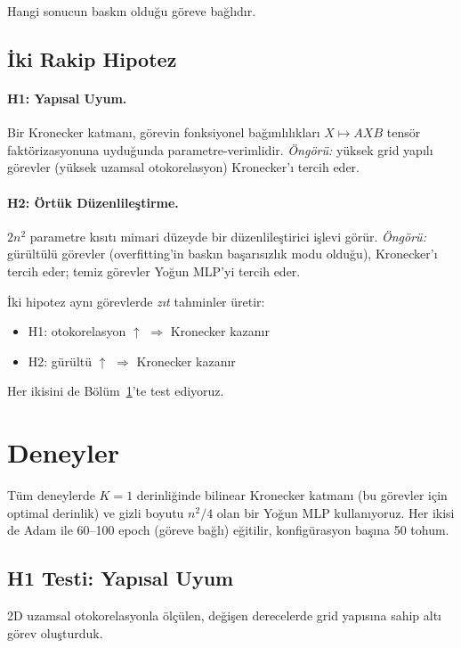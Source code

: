 \documentclass[11pt,a4paper]{article}
\begin{document}
Hangi sonucun baskın olduğu göreve bağlıdır.

\subsection{İki Rakip Hipotez}
\label{sec:hypotheses}

\paragraph{H1: Yapısal Uyum.}
Bir Kronecker katmanı, görevin fonksiyonel bağımlılıkları
$X \mapsto AXB$ tensör faktörizasyonuna uyduğunda
parametre-verimlidir. \emph{Öngörü:} yüksek grid yapılı görevler
(yüksek uzamsal otokorelasyon) Kronecker'ı tercih eder.

\paragraph{H2: Örtük Düzenlileştirme.}
$2n^2$ parametre kısıtı mimari düzeyde bir düzenlileştirici
işlevi görür. \emph{Öngörü:} gürültülü görevler (overfitting'in
baskın başarısızlık modu olduğu), Kronecker'ı tercih eder;
temiz görevler Yoğun MLP'yi tercih eder.

İki hipotez aynı görevlerde \emph{zıt} tahminler üretir:
\begin{itemize}
\item H1: otokorelasyon $\uparrow$ $\Rightarrow$ Kronecker kazanır
\item H2: gürültü $\uparrow$ $\Rightarrow$ Kronecker kazanır
\end{itemize}

Her ikisini de Bölüm~\ref{sec:experiments}'te test ediyoruz.


\section{Deneyler}
\label{sec:experiments}

Tüm deneylerde $K=1$ derinliğinde bilinear Kronecker katmanı
(bu görevler için optimal derinlik) ve gizli boyutu $n^2/4$ olan
bir Yoğun MLP kullanıyoruz. Her ikisi de Adam ile 60--100 epoch
(göreve bağlı) eğitilir, konfigürasyon başına 50 tohum.

\subsection{H1 Testi: Yapısal Uyum}
\label{sec:h1}

2D uzamsal otokorelasyonla ölçülen, değişen derecelerde grid
yapısına sahip altı görev oluşturduk.
\end{document}
